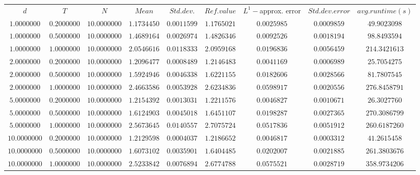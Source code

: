 \begin{tabular}{ccccccccc}
$d$ & $T$ & $N$ & $Mean$ & $Std. dev.$ & $Ref. value$ & $L^1-$approx. error & $Std. dev. error$ & $avg. runtime (s)$\\
$1.0000000$ & $0.2000000$ & $10.0000000$ & $1.1734450$ & $0.0011599$ & $1.1765021$ & $0.0025985$ & $0.0009859$ & $49.9023098$\\
$1.0000000$ & $0.5000000$ & $10.0000000$ & $1.4689164$ & $0.0026974$ & $1.4826346$ & $0.0092526$ & $0.0018194$ & $98.8493594$\\
$1.0000000$ & $1.0000000$ & $10.0000000$ & $2.0546616$ & $0.0118333$ & $2.0959168$ & $0.0196836$ & $0.0056459$ & $214.3421613$\\
$2.0000000$ & $0.2000000$ & $10.0000000$ & $1.2096477$ & $0.0008489$ & $1.2146483$ & $0.0041169$ & $0.0006989$ & $25.7054275$\\
$2.0000000$ & $0.5000000$ & $10.0000000$ & $1.5924946$ & $0.0046338$ & $1.6221155$ & $0.0182606$ & $0.0028566$ & $81.7807545$\\
$2.0000000$ & $1.0000000$ & $10.0000000$ & $2.4663586$ & $0.0053928$ & $2.6234836$ & $0.0598917$ & $0.0020556$ & $276.8458791$\\
$5.0000000$ & $0.2000000$ & $10.0000000$ & $1.2154392$ & $0.0013031$ & $1.2211576$ & $0.0046827$ & $0.0010671$ & $26.3027760$\\
$5.0000000$ & $0.5000000$ & $10.0000000$ & $1.6124903$ & $0.0045018$ & $1.6451107$ & $0.0198287$ & $0.0027365$ & $270.3086799$\\
$5.0000000$ & $1.0000000$ & $10.0000000$ & $2.5673645$ & $0.0140557$ & $2.7075724$ & $0.0517836$ & $0.0051912$ & $260.6187260$\\
$10.0000000$ & $0.2000000$ & $10.0000000$ & $1.2129598$ & $0.0004037$ & $1.2186652$ & $0.0046817$ & $0.0003312$ & $41.2615458$\\
$10.0000000$ & $0.5000000$ & $10.0000000$ & $1.6073102$ & $0.0035901$ & $1.6404485$ & $0.0202007$ & $0.0021885$ & $261.3803676$\\
$10.0000000$ & $1.0000000$ & $10.0000000$ & $2.5233842$ & $0.0076894$ & $2.6774788$ & $0.0575521$ & $0.0028719$ & $358.9734206$\\
\end{tabular}
